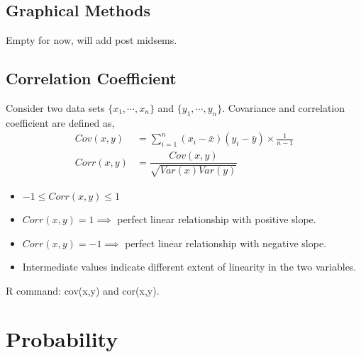 \documentclass[12pt]{article}
\begin{document}
	\subsection{Graphical Methods}
	Empty for now, will add post midsems.
	\subsection{Correlation Coefficient}
	Consider two data sets $ \{x_1,\cdots,x_n \}$ and $ \{y_1,\cdots, y_n \}$. Covariance and correlation coefficient are defined as,
	\begin{align}
		Cov(x,y)&=\sum_{i=1}^{n}(x_i-\bar{x})(y_i-\bar{y})\times \frac{1}{n-1}\\
		Corr(x,y)&=\dfrac{Cov(x,y)}{\sqrt{Var(x)Var(y)}}
	\end{align}
	\begin{itemize}
		\item $ -1\leq Corr(x,y)\leq 1 $
		\item $Corr(x,y)=1  \implies $ perfect linear relationship with positive slope.
		\item $Corr(x,y)=-1  \implies $ perfect linear relationship with negative slope.
		\item Intermediate values indicate different extent of linearity in the two variables.
	\end{itemize}
R command: {\ttfamily cov(x,y)} and {\ttfamily cor(x,y)}.

    \section{Probability}



	
	
	
	
	
	
	
	
	
	
	
	
	
	
	
	
\end{document}

